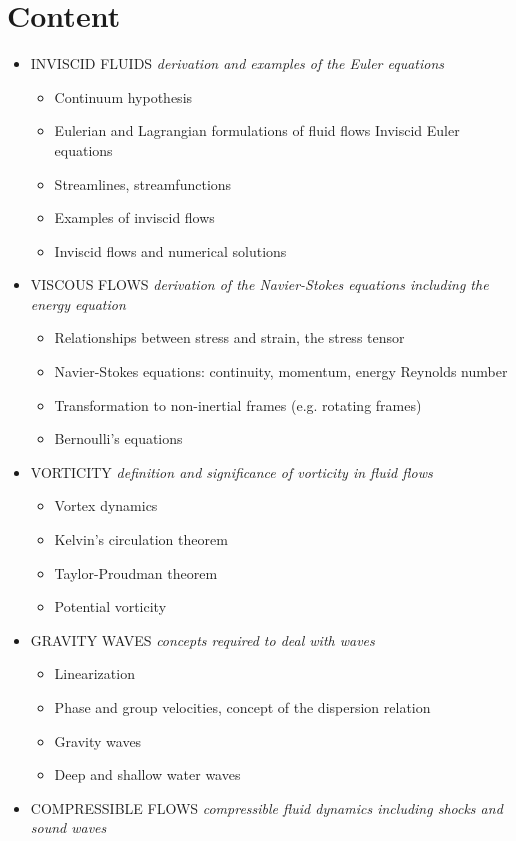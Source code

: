 \documentclass[12pt, preprint]{aastex}
\begin{document}
\section*{Content}
\begin{itemize}
\item INVISCID FLUIDS \emph{derivation and examples of the Euler equations}
\begin{itemize}
\item Continuum hypothesis
\item Eulerian and Lagrangian formulations of fluid flows Inviscid Euler equations
\item Streamlines, streamfunctions
\item Examples of inviscid flows
\item Inviscid flows and numerical solutions
\end{itemize}
\item VISCOUS FLOWS \emph{derivation of the Navier-Stokes equations including the energy equation}
\begin{itemize}
\item Relationships between stress and strain, the stress tensor
\item Navier-Stokes equations: continuity, momentum, energy Reynolds number
\item Transformation to non-inertial frames (e.g. rotating frames)
\item Bernoulli’s equations
\end{itemize}
\item VORTICITY \emph{definition and significance of vorticity in fluid flows}
\begin{itemize}
\item Vortex dynamics
\item Kelvin’s circulation theorem
\item Taylor-Proudman theorem
\item Potential vorticity
\end{itemize}
\item GRAVITY WAVES \emph{concepts required to deal with waves}
\begin{itemize}
\item Linearization
\item Phase and group velocities, concept of the dispersion relation
\item  Gravity waves
\item Deep and shallow water waves
\end{itemize}
\item COMPRESSIBLE FLOWS \emph{compressible fluid dynamics including shocks and sound waves}

\end{itemize}
\end{document}
